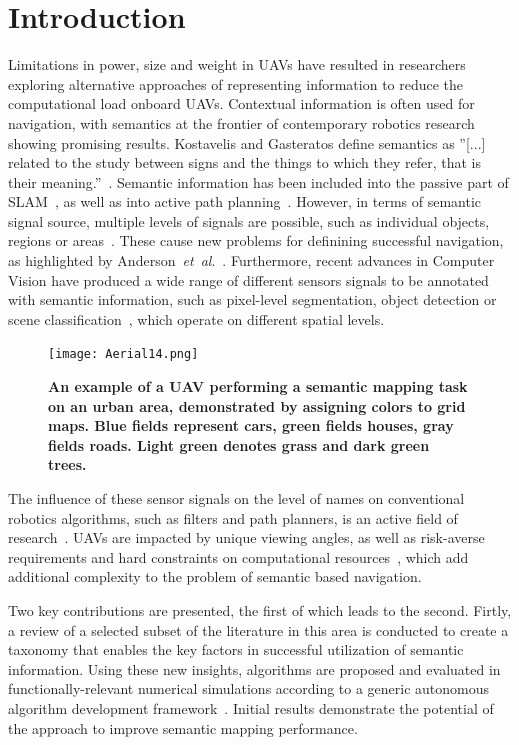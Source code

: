\documentclass[twocolumn,letterpaper]{IEEEAerospaceCLS}  %
\newcommand{\abbreviation}[1]{\emph{#1}.}
\newcommand{\etal}{\abbreviation{et~al}}
\begin{document}
\section{Introduction} \label{sec:Intro}
Limitations in power, size and weight in UAVs have resulted in researchers exploring alternative approaches of representing information to reduce the computational load onboard UAVs. Contextual information is often used for navigation, with semantics at the frontier of contemporary robotics research showing promising results. Kostavelis and Gasteratos define semantics as ''[...] related to the study between signs and the things to which they refer, that is their meaning.''~\cite{kostavelis_semantic_2015}. Semantic information has been included into the passive part of SLAM~\cite{cadena_past_2016,zhang_hierarchical_2019}, as well as into active path planning~\cite{koch_automatic_2019,alirezaie_exploiting_2017}.  However, in terms of semantic signal source, multiple levels of signals are possible, such as individual objects, regions or areas~\cite{kostavelis_semantic_2015}. These cause new problems for definining successful navigation, as highlighted by Anderson~\etal~\cite{anderson_evaluation_2018}. Furthermore, recent advances in Computer Vision have produced a wide range of different sensors signals to be annotated with semantic information, such as pixel-level segmentation, object detection or scene classification~\cite{alom_history_2018}, which operate on different spatial levels.
\begin{figure}[t]
    \centering
    \texttt{[image: Aerial14.png]}\\
    \caption{\bf{An example of a UAV performing a semantic mapping task on an urban area, demonstrated by assigning colors to grid maps. Blue fields represent cars, green fields houses, gray fields roads. Light green denotes grass and dark green trees.}}
    \label{fig:AerialImg}
\end{figure}
The influence of these sensor signals on the level of names on conventional robotics algorithms, such as filters and path planners, is an active field of research~\cite{kostavelis_semantic_2015,cadena_past_2016,anderson_evaluation_2018}. UAVs are impacted by unique viewing angles, as well as risk-averse requirements and hard constraints on computational resources~\cite{mandel_method_2020,gonzalez_unmanned_2016,boroujerdian_mavbench_2018}, which add additional complexity to the problem of semantic based navigation.

Two key contributions are presented, the first of which leads to the second. Firtly, a review of a selected subset of the literature in this area is conducted to create a taxonomy that enables the key factors in successful utilization of semantic information. Using these new insights, algorithms are proposed and evaluated in functionally-relevant numerical simulations according to a generic autonomous algorithm development framework~\cite{ladosz_generic_2019}. Initial results demonstrate the potential of the approach to improve semantic mapping performance.
\end{document}
